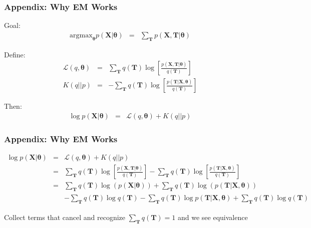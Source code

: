 \documentclass{beamer}
\numberwithin{equation}{section}
\begin{document}
\begin{frame}
\frametitle{Appendix: Why EM Works}

Goal: 
\begin{eqnarray}
\text{argmax}_{\boldsymbol{\theta}} p(\boldsymbol{X}| \boldsymbol{\theta} ) & = & \sum_{\boldsymbol{T}} p(\boldsymbol{X}, \boldsymbol{T}|\boldsymbol{\theta}) \nonumber 
\end{eqnarray}

Define: 
\begin{eqnarray}
\mathcal{L}(q, \boldsymbol{\theta}) & = & \sum_{\boldsymbol{T}} q(\boldsymbol{T}) \log \left[ \frac{ p(\boldsymbol{X}, \boldsymbol{T}| \boldsymbol{\theta}) }{q(\boldsymbol{T} )}   \right] \nonumber \\
K(q||p) & = & - \sum_{\boldsymbol{T}} q(\boldsymbol{T}) \log \left[ \frac{p(\boldsymbol{T}| \boldsymbol{X}, \boldsymbol{\theta}) }{q(\boldsymbol{T})}    \right] \nonumber 
\end{eqnarray}

Then: 
\begin{eqnarray}
\log p(\boldsymbol{X}| \boldsymbol{\theta}) & = & \mathcal{L}(q, \boldsymbol{\theta})  + K(q||p) \nonumber 
\end{eqnarray}



\end{frame}

\begin{frame}
\frametitle{Appendix: Why EM Works}

\begin{footnotesize}
\begin{eqnarray}
\log p(\boldsymbol{X}| \boldsymbol{\theta}) & = & \mathcal{L}(q, \boldsymbol{\theta})  + K(q||p) \nonumber \\
& = & \sum_{\boldsymbol{T}} q(\boldsymbol{T}) \log \left[ \frac{ p(\boldsymbol{X}, \boldsymbol{T}| \boldsymbol{\theta}) }{q(\boldsymbol{T} )}   \right] - \sum_{\boldsymbol{T}} q(\boldsymbol{T}) \log \left[ \frac{p(\boldsymbol{T}| \boldsymbol{X}, \boldsymbol{\theta}) }{q(\boldsymbol{T})}    \right] \nonumber \\
& =& \sum_{\boldsymbol{T} } q(\boldsymbol{T}) \log(p(\boldsymbol{X}|\boldsymbol{\theta}) ) + \sum_{\boldsymbol{T} } q(\boldsymbol{T}) \log (p(\boldsymbol{T}|\boldsymbol{X}, \boldsymbol{\theta}) )  \nonumber \\
&&  - \sum_{\boldsymbol{T}} q(\boldsymbol{T}) \log q(\boldsymbol{T}) - \sum_{\boldsymbol{T}} q(\boldsymbol{T}) \log p(\boldsymbol{T}|\boldsymbol{X}, \boldsymbol{\theta}) + \sum_{\boldsymbol{T}} q(\boldsymbol{T}) \log q(\boldsymbol{T}) \nonumber 
\end{eqnarray}
\end{footnotesize}

Collect terms that cancel and recognize $\sum_{\boldsymbol{T}} q(\boldsymbol{T}) = 1$ and we see equivalence


\end{frame}
\end{document}
